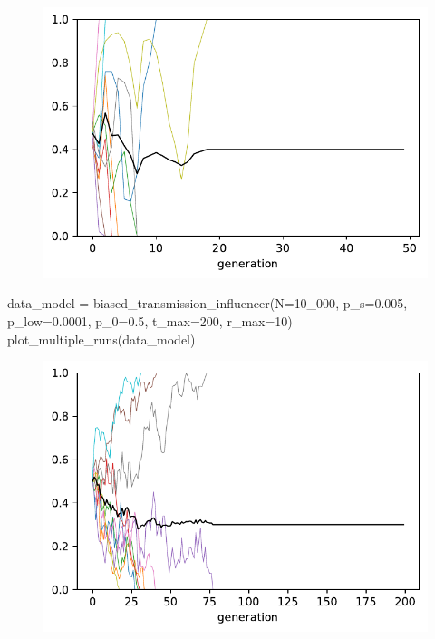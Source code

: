 \documentclass[
  a4paperpaper,
  ,captions=tableheading
]{scrbook}
\newenvironment{Shaded}{\begin{snugshade}}{\end{snugshade}}
\newcommand{\DecValTok}[1]{\textcolor[rgb]{0.68,0.00,0.00}{#1}}
\newcommand{\FloatTok}[1]{\textcolor[rgb]{0.68,0.00,0.00}{#1}}
\newcommand{\NormalTok}[1]{\textcolor[rgb]{0.00,0.23,0.31}{#1}}
\newcommand{\OperatorTok}[1]{\textcolor[rgb]{0.37,0.37,0.37}{#1}}
\begin{document}
\begin{figure}[H]

{\centering \includegraphics{chapter07_files/figure-pdf/cell-11-output-1.pdf}

}

\end{figure}

\begin{Shaded}
\begin{Highlighting}[]
\NormalTok{data\_model }\OperatorTok{=}\NormalTok{ biased\_transmission\_influencer(N}\OperatorTok{=}\DecValTok{10\_000}\NormalTok{, p\_s}\OperatorTok{=}\FloatTok{0.005}\NormalTok{, p\_low}\OperatorTok{=}\FloatTok{0.0001}\NormalTok{, p\_0}\OperatorTok{=}\FloatTok{0.5}\NormalTok{, t\_max}\OperatorTok{=}\DecValTok{200}\NormalTok{, r\_max}\OperatorTok{=}\DecValTok{10}\NormalTok{)}
\NormalTok{plot\_multiple\_runs(data\_model)}
\end{Highlighting}
\end{Shaded}

\begin{figure}[H]

{\centering \includegraphics{chapter07_files/figure-pdf/cell-12-output-1.pdf}

}

\end{figure}
\end{document}
